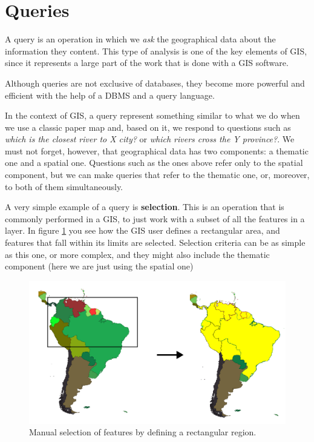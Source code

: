 \section{Queries}

A query is an operation in which we \emph{ask} the geographical data about the information they content. This type of analysis is one of the key elements of GIS, since it represents a large part of the work that is done with a GIS software.

Although queries are not exclusive of databases, they become more powerful and efficient with the help of a DBMS and a query language.

In the context of GIS, a query represent something similar to what we do when we use a classic paper map and, based on it, we respond to questions such as \emph{which is the closest river to X city?} or \emph{which rivers cross the Y province?}. We must not forget, however, that geographical data has two components: a thematic one and a spatial one. Questions such as the ones above refer only to the spatial component, but we can make queries that refer to the thematic one, or, moreover, to both of them simultaneously.

A very simple example of a query is \textbf{selection}. This is an operation that is commonly performed in a GIS, to just work with a subset of all the features in a layer. In figure \ref{Fig:Selection} you see how the GIS user defines a rectangular area, and features that fall within its limits are selected. Selection criteria can be as simple as this one, or more complex, and they might also include the thematic component (here we are just using the spatial one)

\begin{figure}[!hbt]   
\centering
\includegraphics[width=\textwidth]{databases/Selection.png}
\caption{\small Manual selection of features by defining a rectangular region.}
\label{Fig:Selection} 
\end{figure}


